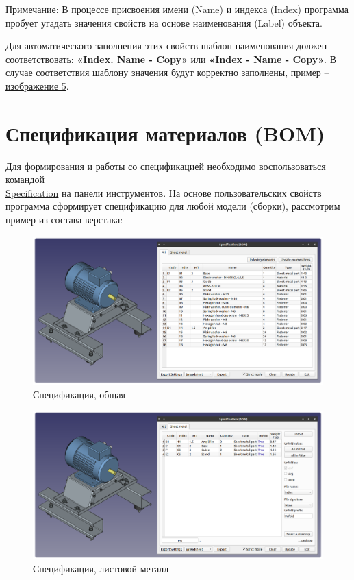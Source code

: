 \documentclass[a4paper,12pt]{article}
\begin{document}
Примечание: В процессе присвоения имени (Name) и индекса (Index) программа пробует угадать значения свойств на основе наименования (Label) объекта.

Для автоматического заполнения этих свойств шаблон наименования должен соответствовать: \textbf{«Index. Name - Copy»} или \textbf{«Index - Name - Copy»}. В случае соответствия шаблону значения будут корректно заполнены, пример -- \hyperref[sec:properties]{изображение 5}.

\pagebreak




\section{Спецификация материалов (BOM)}

Для формирования и работы со спецификацией необходимо воспользоваться командой\\\hyperref[sec:4]{Specification} на панели инструментов. На основе пользовательских свойств программа сформирует спецификацию для любой модели (сборки), рассмотрим пример из состава верстака:

\begin{figure}[htp]
	\centering
	\includegraphics[width=1\textwidth]{img/specification_all.png}
	\caption{Спецификация, общая}
	\label{sec:specification_all}
\end{figure}

\begin{figure}[htp]
	\centering
	\includegraphics[width=1\textwidth]{img/specification_sm.png}
	\caption{Спецификация, листовой металл}
	\label{sec:specification_sm}
\end{figure}
\end{document}
